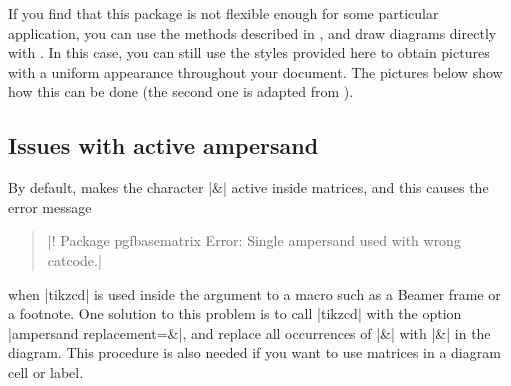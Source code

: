 \documentclass[a4paper]{ltxdoc}
\begin{document}
If you find that this package is not flexible enough for some
particular application, you can use the methods described in
\cite{lenders}, \cite{milne} and draw diagrams directly with
\tikzname.  In this case, you can still use the styles provided here
to obtain pictures with a uniform appearance throughout your document.
The pictures below show how this can be done (the second one is
adapted from \cite{milne}).

\begin{codeexample}[]
\end{codeexample}


\begin{codeexample}[]
\end{codeexample}

\subsection{Issues with active ampersand}
\label{sec:issues-with-active-ampersand}

By default, \tikzname{} makes the character |&| active inside
matrices, and this causes the error message
\begin{quote}
  |! Package pgfbasematrix Error: Single ampersand used with wrong catcode.|
\end{quote}
when |{tikzcd}| is used inside the argument to a macro such as a Beamer
frame or a footnote.  One solution to this problem is to call |{tikzcd}|
with the option |ampersand replacement=\&|, and replace all
occurrences of |&| with |\&| in the diagram.  This procedure is also
needed if you want to use matrices in a diagram cell or label.
\end{document}

